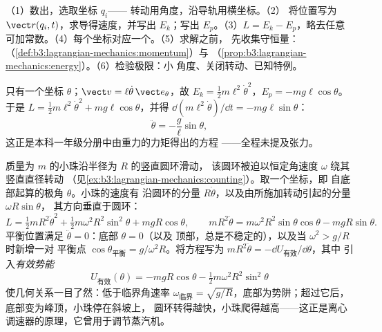 \begin{method}[拉格朗日方法步骤]\label{met:b3:lagrangian-mechanics:recipe}
（1）数出，选取坐标 $q_i$——
转动用角度，沿导轨用横坐标。（2）
将位置写为 $\vect r(q_i, t)$，求导得速度，并写出
$E_k$；写出 $E_p$。（3）$L = E_k - E_p$，略去任意
可加常数。（4）每个坐标对应一个。（5）求解之前，
先收集守恒量：
（\cref{def:b3:lagrangian-mechanics:momentum}）与
（\cref{prop:b3:lagrangian-mechanics:energy}）。（6）检验极限：小
角度、关闭转动、已知特例。
\end{method}

\begin{example}[单摆：三行推导]\label{ex:b3:lagrangian-mechanics:pendulum}
只有一个坐标 $\theta$；$\vect v = \ell\dot\theta\,\vect e_\theta$，故
$E_k = \tfrac12 m\ell^2\dot\theta^2$，$E_p = -mg\ell\cos\theta$。
于是 $L = \tfrac12 m\ell^2\dot\theta^2 + mg\ell\cos\theta$，并得
$\dd(m\ell^2\dot\theta)/\dd t = -mg\ell\sin\theta$：
\[
\ddot\theta = -\frac{g}{\ell}\sin\theta ,
\]
这正是本科一年级分册中由重力的力矩得出的方程
——全程未提及张力。
\end{example}

\begin{example}[旋转圆环上的小珠]\label{ex:b3:lagrangian-mechanics:hoop}
质量为 $m$ 的小珠沿半径为 $R$ 的竖直圆环滑动，
该圆环被迫以恒定角速度 $\omega$ 绕其竖直直径转动
（见\cref{ex:b3:lagrangian-mechanics:counting}）。取一个坐标，即
自底部起算的极角 $\theta$。小珠的速度有
沿圆环的分量 $R\dot\theta$，以及由所施加转动引起的分量 $\omega R\sin\theta$，
其方向垂直于圆环：
\[
L = \tfrac12 mR^2\dot\theta^2 + \tfrac12 m\omega^2R^2\sin^2\theta
 + mgR\cos\theta ,
\qquad
mR^2\ddot\theta = m\omega^2R^2\sin\theta\cos\theta - mgR\sin\theta .
\]
平衡位置满足 $\ddot\theta = 0$：底部 $\theta = 0$（以及
顶部，总是不稳定的），以及当 $\omega^2 > g/R$ 时新增一对
平衡点 $\cos\theta_{\text{平衡}} = g/\omega^2R$。将方程写为
$mR^2\ddot\theta = -\dd U_{\text{有效}}/\dd\theta$，其中
引入\emph{有效势能}
\[
U_{\text{有效}}(\theta) = -mgR\cos\theta
 - \tfrac12 m\omega^2R^2\sin^2\theta
\]
使几何关系一目了然：低于临界角速率
$\omega_{\text{临界}} = \sqrt{g/R}$，底部为势阱；超过它后，
底部变为峰顶，小珠停在斜坡上，
圆环转得越快，小珠爬得越高——这正是离心
调速器的原理，它曾用于调节蒸汽机。
\end{example}

